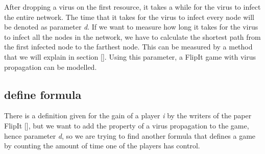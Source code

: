 After dropping a virus on the first resource, it takes a while for the virus to infect the entire network. The time that it takes for the virus to infect every node will be denoted as parameter \textit{d}. If we want to measure how long it takes for the virus to infect all the nodes in the network, we have to calculate the shortest path from the first infected node to the farthest node. This can be measured by a method that we will explain in section []. Using this parameter, a FlipIt game with virus propagation can be modelled. \\ 








\subsection{define formula}


There is a definition given for the gain of a player \textit{i} by the writers of the paper FlipIt [], but we want to add the property of a virus propagation to the game, hence parameter \textit{d}, so we are trying to find another formula that defines a game by counting the amount of time one of the players has control. \\


